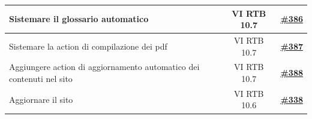 \documentclass[a4paper,12pt]{article}
\begin{document}
\begin{longtable}{|p{}|c|c|}
\hline
\rowcolor{gray!20}
Sistemare il glossario automatico & VI RTB 10.7 & \href{https://github.com/SWE-BitByBit/SWE-docs/issues/386}{\textbf{\#386}} \\
\hline
\rowcolor{white}
Sistemare la action di compilazione dei pdf & VI RTB 10.7 & \href{https://github.com/SWE-BitByBit/SWE-docs/issues/387}{\textbf{\#387}} \\
\hline
\rowcolor{gray!20}
Aggiungere action di aggiornamento automatico dei contenuti nel sito & VI RTB 10.7 & \href{https://github.com/SWE-BitByBit/SWE-docs/issues/388}{\textbf{\#388}} \\
\hline
\rowcolor{white}
Aggiornare il sito & VI RTB 10.6 & \href{https://github.com/SWE-BitByBit/SWE-docs/issues/338}{\textbf{\#338}} \\
\hline
\end{longtable}
\normalsize
\end{document}
